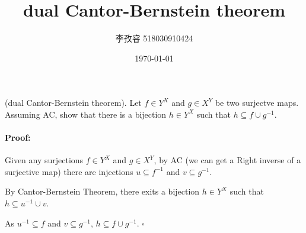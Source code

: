 \documentclass{article}
\title{dual Cantor-Bernstein theorem}
\author{李孜睿 518030910424}
\date{\today}
\newenvironment{myproof}{\ignorespaces\paragraph{Proof:}}{\hfill $\square$\par\noindent}
\begin{document}
	\maketitle
	(dual Cantor-Bernstein theorem). Let $f \in Y^X$ and $g \in X^Y$ be two surjectve maps. Assuming AC, show that there is a bijection $h \in Y^X$ such that $h\subseteq f\cup g^{-1}$.
	\begin{myproof}
		Given any surjections $f\in Y^X$ and $g\in X^Y$, by AC (we can get a Right inverse of a surjective map) there are injections $u\subseteq f^{-1}$ and $v\subseteq g^{-1}$.
		
		By Cantor-Bernstein Theorem, there exits a bijection $h\in Y^X$ such that $h\subseteq u^{-1}\cup v$.
		
		As $u^{-1}\subseteq f$ and $v\subseteq g^{-1}$, $h\subseteq f\cup g^{-1}$.
	\end{myproof}
\end{document}
